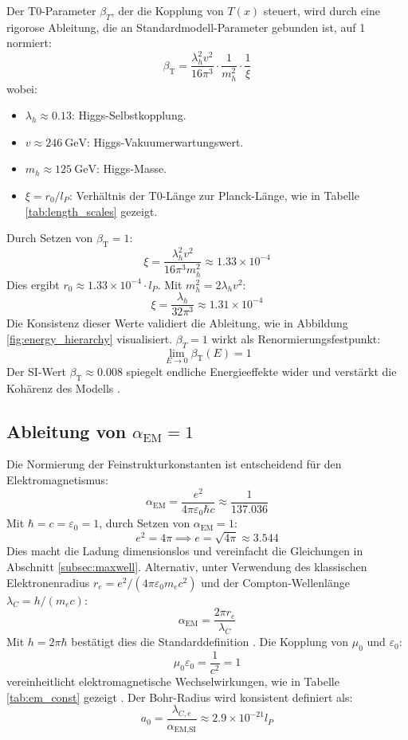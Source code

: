 \documentclass[12pt,a4paper]{article}
\newcommand{\Tfield}{T(x)}
\newcommand{\alphaEM}{\alpha_{\text{EM}}}
\newcommand{\betaT}{\beta_{\text{T}}}
\begin{document}
	Der T0-Parameter \(\beta_T\), der die Kopplung von \(\Tfield\) steuert, wird durch eine rigorose Ableitung, die an Standardmodell-Parameter gebunden ist, auf 1 normiert:
	\[
	\betaT = \frac{\lambda_h^2 v^2}{16 \pi^3} \cdot \frac{1}{m_h^2} \cdot \frac{1}{\xi}
	\]
	wobei:
	\begin{itemize}
		\item \(\lambda_h \approx 0.13\): Higgs-Selbstkopplung.
		\item \(v \approx \SI{246}{\giga\electronvolt}\): Higgs-Vakuumerwartungswert.
		\item \(m_h \approx \SI{125}{\giga\electronvolt}\): Higgs-Masse.
		\item \(\xi = r_0/l_P\): Verhältnis der T0-Länge zur Planck-Länge, wie in Tabelle \ref{tab:length_scales} gezeigt.
	\end{itemize}
	
	Durch Setzen von \(\betaT = 1\):
	\[
	\xi = \frac{\lambda_h^2 v^2}{16 \pi^3 m_h^2} \approx 1.33 \times 10^{-4}
	\]
	Dies ergibt \(r_0 \approx 1.33 \times 10^{-4} \cdot l_P\). Mit \(m_h^2 = 2 \lambda_h v^2\):
	\[
	\xi = \frac{\lambda_h}{32 \pi^3} \approx 1.31 \times 10^{-4}
	\]
	Die Konsistenz dieser Werte validiert die Ableitung, wie in Abbildung \ref{fig:energy_hierarchy} visualisiert. \(\beta_T = 1\) wirkt als Renormierungsfestpunkt:
	\[
	\lim_{E \to 0} \betaT(E) = 1
	\]
	Der SI-Wert \(\betaT \approx 0.008\) spiegelt endliche Energieeffekte wider und verstärkt die Kohärenz des Modells \cite{pascher_beta_2025}.
	
	\subsection{Ableitung von \(\alpha_{\text{EM}} = 1\)}
	\label{subsec:alpha_derivation}
	
	Die Normierung der Feinstrukturkonstanten ist entscheidend für den Elektromagnetismus:
	\[
	\alphaEM = \frac{e^2}{4 \pi \varepsilon_0 \hbar c} \approx \frac{1}{137.036}
	\]
	Mit \(\hbar = c = \varepsilon_0 = 1\), durch Setzen von \(\alphaEM = 1\):
	\[
	e^2 = 4 \pi \implies e = \sqrt{4 \pi} \approx 3.544
	\]
	Dies macht die Ladung dimensionslos und vereinfacht die Gleichungen in Abschnitt \ref{subsec:maxwell}. Alternativ, unter Verwendung des klassischen Elektronenradius \(r_e = e^2/(4 \pi \varepsilon_0 m_e c^2)\) und der Compton-Wellenlänge \(\lambda_C = h/(m_e c)\):
	\[
	\alphaEM = \frac{2 \pi r_e}{\lambda_C}
	\]
	Mit \(h = 2 \pi \hbar\) bestätigt dies die Standarddefinition \cite{pascher_alpha_2025}. Die Kopplung von \(\mu_0\) und \(\varepsilon_0\):
	\[
	\mu_0 \varepsilon_0 = \frac{1}{c^2} = 1
	\]
	vereinheitlicht elektromagnetische Wechselwirkungen, wie in Tabelle \ref{tab:em_const} gezeigt \cite{pascher_alphabeta_2025}. Der Bohr-Radius wird konsistent definiert als:
	\[
	a_0 = \frac{\lambda_{C,e}}{\alpha_{\text{EM,SI}}} \approx 2.9 \times 10^{-21} l_P
	\]
	
\end{document}
